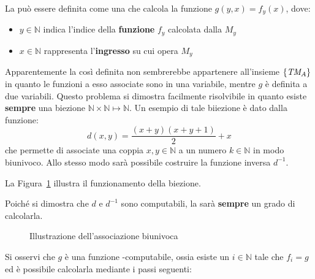 \documentclass[italian, 10pt]{article}
\begin{document}
\bigskip
La \UTM può essere definita come una \TM che calcola la funzione \(g(y, x) = f_y(x)\), dove:

\begin{itemize}
  \item \(y \in \mathbb{N}\) indica l'indice della \textbf{funzione} \(f_y\) calcolata dalla \TM \(M_y\)
  \item \(x \in \mathbb{N}\) rappresenta l'\textbf{ingresso} su cui opera \(M_y\)
\end{itemize}

Apparentemente la \UTM così definita non sembrerebbe appartenere all'insieme \(\{\textit{TM}_A\}\) in quanto le funzioni a esso associate sono in una variabile, mentre \(g\) è definita a due variabili.
Questo problema si dimostra facilmente risolvibile in quanto esiste \textbf{sempre} una biezione \(\mathbb{N} \times \mathbb{N} \mapsto \mathbb{N}\).
Un esempio di tale biiezione è dato dalla funzione:
\[ d(x, y) = \dfrac{(x+y)(x+y+1)}{2} + x \]
che permette di associate una coppia \(x, y \in \mathbb{N}\) a un numero  \(k \in \mathbb{N}\) in modo biunivoco.
Allo stesso modo sarà possibile costruire la funzione inversa \(d^{-1}\).

La Figura~\ref{fig:associazione-biunivoca} illustra il funzionamento della biezione.

\bigskip
Poiché si dimostra che \(d\) e \(d^{-1}\) sono computabili, la \TM sarà \textbf{sempre} un grado di calcolarla.

\begin{figure}[htbp]
  \bigskip
  \centering
  \caption{Illustrazione dell'associazione biunivoca}
  \label{fig:associazione-biunivoca}
  \bigskip
\end{figure}

Si osservi che \(g\) è una funzione \TM-computabile, ossia esiste un \(i \in \mathbb{N}\) tale che \(f_i = g\) ed è possibile calcolarla mediante i passi seguenti:
\end{document}
